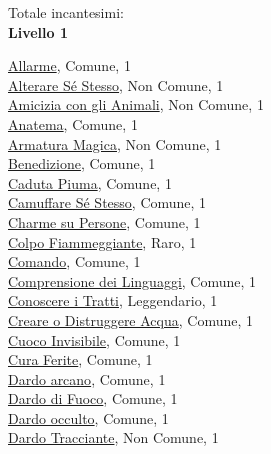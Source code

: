 \begin{multicols}{3}
{{Totale incantesimi: \theinclvzero\\


\textbf{Livello 1} 

\hyperlink{Allarme}{Allarme}, Comune, 1\\
\hyperlink{Alterare Sé Stesso}{Alterare Sé Stesso}, Non Comune, 1\\
\hyperlink{Amicizia con gli Animali}{Amicizia con gli Animali}, Non Comune, 1\\
\hyperlink{Anatema}{Anatema}, Comune, 1\\
\hyperlink{Armatura Magica}{Armatura Magica}, Non Comune, 1\\
\hyperlink{Benedizione}{Benedizione}, Comune, 1\\
\hyperlink{Caduta Piuma}{Caduta Piuma}, Comune, 1\\
\hyperlink{Camuffare Sé Stesso}{Camuffare Sé Stesso}, Comune, 1\\
\hyperlink{Charme su Persone}{Charme su Persone}, Comune, 1\\
\hyperlink{Colpo Fiammeggiante}{Colpo Fiammeggiante}, Raro, 1\\
\hyperlink{Comando}{Comando}, Comune, 1\\
\hyperlink{Comprensione dei Linguaggi}{Comprensione dei Linguaggi}, Comune, 1\\
\hyperlink{Conoscere i Tratti}{Conoscere i Tratti}, Leggendario, 1\\
\hyperlink{Creare o Distruggere Acqua}{Creare o Distruggere Acqua}, Comune, 1\\
\hyperlink{Cuoco Invisibile}{Cuoco Invisibile}, Comune, 1\\
\hyperlink{Cura Ferite}{Cura Ferite}, Comune, 1\\
\hyperlink{Dardo arcano}{Dardo arcano}, Comune, 1\\
\hyperlink{Dardo di Fuoco}{Dardo di Fuoco}, Comune, 1\\
\hyperlink{Dardo occulto}{Dardo occulto}, Comune, 1\\
\hyperlink{Dardo Tracciante}{Dardo Tracciante}, Non Comune, 1\\
}}
\end{multicols}
